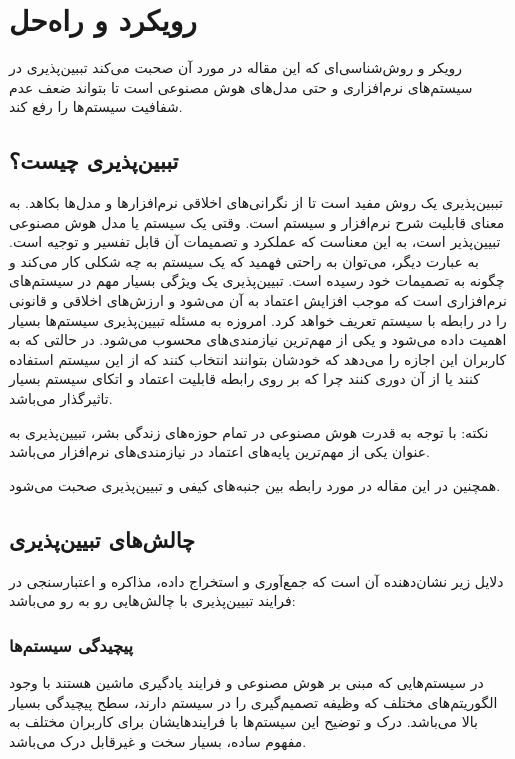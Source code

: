 \section{رویکرد و راه‌حل}

رویکر و روش‌شناسی‌ای که این مقاله در مورد آن صحبت می‌کند تببین‌پذیری در
سیستم‌های نرم‌افزاری و حتی مدل‌های هوش مصنوعی است تا بتواند ضعف عدم شفافیت
سیستم‌ها را رفع کند.

\subsection{تببین‌پذیری چیست؟}

تببین‌پذیری یک روش مفید است تا از نگرانی‌های اخلاقی نرم‌افزار‌ها و مدل‌ها بکاهد.
به معنای قابلیت شرح نرم‌افزار و سیستم است. وقتی یک سیستم یا مدل هوش مصنوعی
تبیین‌پذیر است، به این معناست که عملکرد و تصمیمات آن قابل تفسیر و توجیه است. به
عبارت دیگر، می‌توان به راحتی فهمید که یک سیستم به چه شکلی کار می‌کند و چگونه به
تصمیمات خود رسیده است. تبیین‌پذیری یک ویژگی بسیار مهم در سیستم‌های نرم‌افزاری
است که موجب افزایش اعتماد به آن می‌شود و ارزش‌های اخلاقی و قانونی را در رابطه با
سیستم تعریف خواهد کرد. امروزه به مسئله تبیین‌پذیری سیستم‌ها بسیار اهمیت داده
می‌شود و یکی از مهم‌ترین نیازمندی‌های  محسوب می‌شود. در حالتی
که به کاربران این اجازه را می‌دهد که خودشان بتوانند انتخاب کنند که از این سیستم
استفاده کنند یا از آن دوری کنند چرا که بر روی رابطه قابلیت اعتماد و اتکای سیستم
بسیار تاثیرگذار می‌باشد.

نکته: با توجه به قدرت هوش مصنوعی در تمام حوزه‌های زندگی بشر، تبیین‌پذیری به
عنوان یکی از مهم‌ترین پایه‌های اعتماد در نیازمندی‌های نرم‌افزار می‌باشد.

همچنین در این مقاله در مورد رابطه بین جنبه‌های کیفی و تبیین‌پذیری صحبت می‌شود.

\subsection{چالش‌های تبیین‌پذیری}

دلایل زیر نشان‌دهنده آن است که جمع‌آوری و استخراج داده، مذاکره و اعتبارسنجی در
فرایند تبیین‌پذیری با چالش‌هایی رو به رو می‌باشد:

\subsubsection{پیچیدگی سیستم‌ها}

در سیستم‌هایی که مبنی بر هوش مصنوعی و فرایند یادگیری ماشین هستند با وجود
الگوریتم‌های مختلف که وظیفه تصمیم‌گیری را در سیستم دارند، سطح پیچیدگی بسیار بالا
می‌باشد. درک و توضیح این سیستم‌ها با فرایند‌هایشان برای کاربران مختلف به مفهوم
ساده، بسیار سخت و غیرقابل درک می‌باشد.

